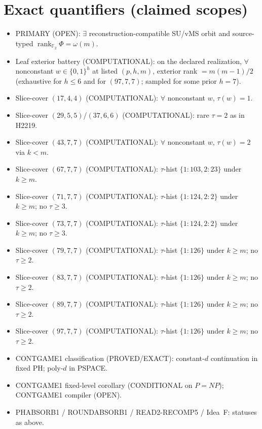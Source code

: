 \documentclass[11pt]{article}
\begin{document}
\section*{Exact quantifiers (claimed scopes)}
\begin{itemize}
\item PRIMARY (OPEN): $\exists$ reconstruction-compatible SU/vMS orbit and source-typed
  $\operatorname{rank}_{\mathbb F_2}\Phi=\omega(m)$.
\item Leaf exterior battery (COMPUTATIONAL): on the declared realization, $\forall$ nonconstant
  $w\in\{0,1\}^h$ at listed $(p,h,m)$, exterior rank $=m(m-1)/2$
  (exhaustive for $h\le6$ and for $(97,7,7)$; sampled for some prior $h{=}7$).
\item Slice-cover $(17,4,4)$ (COMPUTATIONAL): $\forall$ nonconstant $w$, $\tau(w)=1$.
\item Slice-cover $(29,5,5)$/$(37,6,6)$ (COMPUTATIONAL): rare $\tau{=}2$ as in H2219.
\item Slice-cover $(43,7,7)$ (COMPUTATIONAL): $\forall$ nonconstant $w$, $\tau(w)=2$ via $k{<}m$.
\item Slice-cover $(67,7,7)$ (COMPUTATIONAL): $\tau$-hist $\{1{:}103,2{:}23\}$ under $k{\ge}m$.
\item Slice-cover $(71,7,7)$ (COMPUTATIONAL): $\tau$-hist $\{1{:}124,2{:}2\}$ under $k{\ge}m$;
  no $\tau{\ge}3$.
\item Slice-cover $(73,7,7)$ (COMPUTATIONAL): $\tau$-hist $\{1{:}124,2{:}2\}$ under $k{\ge}m$;
  no $\tau{\ge}3$.
\item Slice-cover $(79,7,7)$ (COMPUTATIONAL): $\tau$-hist $\{1{:}126\}$ under $k{\ge}m$;
  no $\tau{\ge}2$.
\item Slice-cover $(83,7,7)$ (COMPUTATIONAL): $\tau$-hist $\{1{:}126\}$ under $k{\ge}m$;
  no $\tau{\ge}2$.
\item Slice-cover $(89,7,7)$ (COMPUTATIONAL): $\tau$-hist $\{1{:}126\}$ under $k{\ge}m$;
  no $\tau{\ge}2$.
\item Slice-cover $(97,7,7)$ (COMPUTATIONAL): $\tau$-hist $\{1{:}126\}$ under $k{\ge}m$;
  no $\tau{\ge}2$.
\item CONTGAME1 classification (PROVED/EXACT): constant-$d$ continuation in fixed PH;
  poly-$d$ in PSPACE.
\item CONTGAME1 fixed-level corollary (CONDITIONAL on $P=NP$); CONTGAME1 compiler (OPEN).
\item PHABSORB1 / ROUNDABSORB1 / READ2-RECOMP5 / Idea~F: statuses as above.
\end{itemize}
\end{document}
